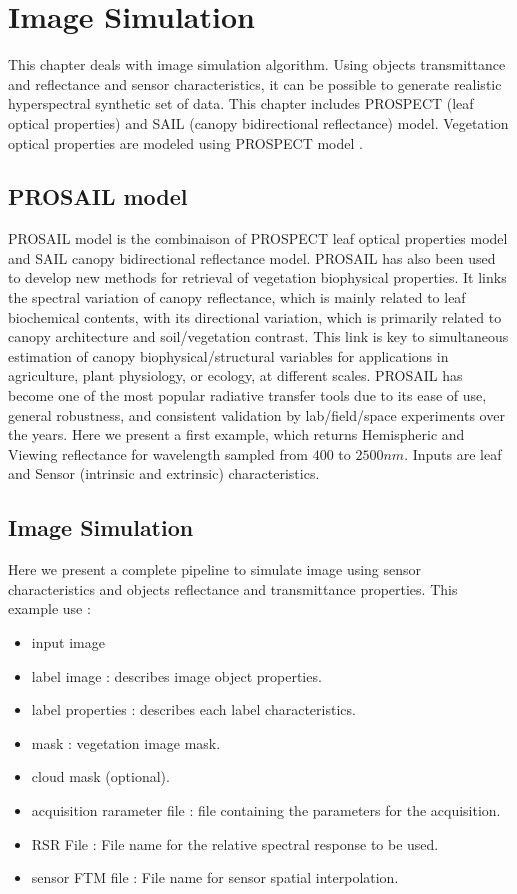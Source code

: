 \chapter{Image Simulation}

This chapter deals with image simulation algorithm. Using objects transmittance and reflectance and sensor characteristics, it can be possible to generate realistic hyperspectral synthetic set of data. This chapter includes PROSPECT (leaf optical properties) and SAIL (canopy bidirectional reflectance) model. Vegetation optical properties are modeled using PROSPECT model \cite{Jacquemoud2009}. 

\section{PROSAIL model}

PROSAIL \cite{Jacquemoud2009} model is the combinaison of PROSPECT leaf optical properties model and SAIL canopy bidirectional reflectance model. PROSAIL has also been used to develop new methods for retrieval of vegetation biophysical properties. It links the spectral variation of canopy reflectance, which is mainly related to leaf biochemical contents, with its directional variation, which is primarily related to canopy architecture and soil/vegetation contrast. This link is key to simultaneous estimation of canopy biophysical/structural variables for applications in agriculture, plant physiology, or ecology, at different scales. PROSAIL has become one of the most popular radiative transfer tools due to its ease of use, general robustness, and consistent validation by lab/field/space experiments over the years. Here we present a first example, which returns Hemispheric and Viewing reflectance for wavelength sampled  from $400$ to $2500 nm$. Inputs are leaf and Sensor (intrinsic and extrinsic) characteristics. 

\label{sec:Prosail}



\section{Image Simulation}

Here we present a complete pipeline to simulate image using sensor characteristics and objects reflectance and transmittance properties. This example use :

\begin{itemize}
\item input image
\item label image : describes image object properties.
\item label properties : describes each label characteristics.
\item mask : vegetation image mask.
\item cloud mask (optional).
\item acquisition rarameter file : file containing the parameters for the acquisition.
\item RSR File : File name for the relative spectral response to be used.
\item sensor FTM file : File name for sensor spatial interpolation.
\end{itemize}

